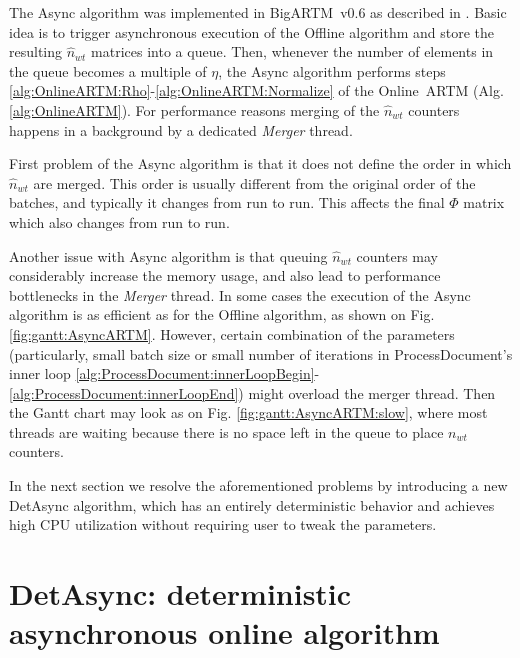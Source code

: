 \documentclass[russian,english]{llncs}
\newcommand{\kw}[1]{\mbox{\textsf{#1}}}
\begin{document}
The \kw{Async} algorithm was implemented in \kw{BigARTM v0.6} as described in \cite{vfardi15aist}.
Basic idea is to trigger asynchronous execution of the \kw{Offline} algorithm
and store the resulting $\hat n_{wt}$ matrices into a queue.
Then, whenever the number of elements in the queue becomes a multiple of $\eta$,
the \kw{Async} algorithm performs steps \ref{alg:OnlineARTM:Rho}-\ref{alg:OnlineARTM:Normalize}
of the \kw{Online ARTM} (Alg. \ref{alg:OnlineARTM}).
For performance reasons merging of the $\hat n_{wt}$ counters happens in a background by a dedicated \emph{Merger} thread.

First problem of the \kw{Async} algorithm is that it does not define the order
in which $\hat n_{wt}$ are merged.
This order is usually different from the original order of the batches,
and typically it changes from run to run.
This affects the final $\Phi$ matrix which also changes from run to run.

Another issue with \kw{Async} algorithm is that
queuing $\hat n_{wt}$ counters may considerably increase the memory usage,
and also lead to performance bottlenecks in the \emph{Merger} thread.
In some cases the execution of the \kw{Async} algorithm is
as efficient as for the \kw{Offline} algorithm,
as shown on Fig. \ref{fig:gantt:AsyncARTM}.
However, certain combination of the parameters
(particularly, small batch size or small number of iterations in \kw{ProcessDocument}'s inner loop 
\ref{alg:ProcessDocument:innerLoopBegin}-\ref{alg:ProcessDocument:innerLoopEnd})
might overload the merger thread.
Then the Gantt chart may look as on Fig. \ref{fig:gantt:AsyncARTM:slow},
where most threads are waiting because there is no space left in the queue
to place $n_{wt}$ counters.

In the next section we resolve the aforementioned problems
by introducing a new \kw{DetAsync} algorithm,
which has an entirely deterministic behavior
and achieves high CPU utilization without requiring user to tweak the parameters.

\section{DetAsync: deterministic asynchronous online algorithm}
\label{sec:DetAsyncARTM}
\end{document}
